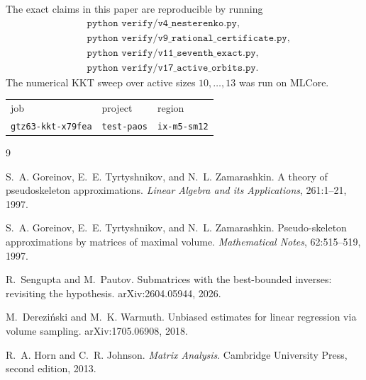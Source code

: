 \documentclass[11pt]{article}
\numberwithin{equation}{section}
\theoremstyle{definition}
\begin{document}
The exact claims in this paper are reproducible by running
\[
\begin{split}
&\texttt{python verify/v4\_nesterenko.py},\\
&\texttt{python verify/v9\_rational\_certificate.py},\\
&\texttt{python verify/v11\_seventh\_exact.py},\\
&\texttt{python verify/v17\_active\_orbits.py}.
\end{split}
\]
The numerical KKT sweep over active sizes $10,\ldots,13$ was run on MLCore.
\begin{center}
\small
\begin{tabular}{@{}lll@{}}
job & project & region\\
\texttt{gtz63-kkt-x79fea} & \texttt{test-paos} & \texttt{ix-m5-sm12}
\end{tabular}
\end{center}

\begin{thebibliography}{9}

S.~A. Goreinov, E.~E. Tyrtyshnikov, and N.~L. Zamarashkin.
\newblock A theory of pseudoskeleton approximations.
\newblock \emph{Linear Algebra and its Applications}, 261:1--21, 1997.

S.~A. Goreinov, E.~E. Tyrtyshnikov, and N.~L. Zamarashkin.
\newblock Pseudo-skeleton approximations by matrices of maximal volume.
\newblock \emph{Mathematical Notes}, 62:515--519, 1997.

R.~Sengupta and M.~Pautov.
\newblock Submatrices with the best-bounded inverses: revisiting the hypothesis.
\newblock arXiv:2604.05944, 2026.

M.~Derezi\'nski and M.~K. Warmuth.
\newblock Unbiased estimates for linear regression via volume sampling.
\newblock arXiv:1705.06908, 2018.

R.~A. Horn and C.~R. Johnson.
\newblock \emph{Matrix Analysis}.
\newblock Cambridge University Press, second edition, 2013.

\end{thebibliography}
\end{document}

